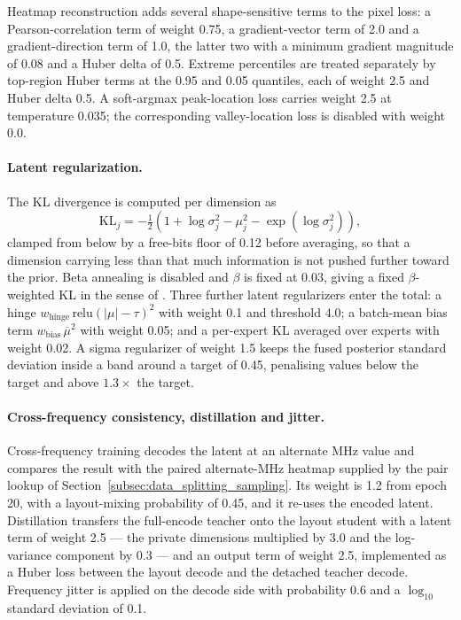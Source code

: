 Heatmap reconstruction adds several shape-sensitive terms to the pixel loss: a Pearson-correlation
term of weight 0.75, a gradient-vector term of 2.0 and a gradient-direction term of 1.0, the latter
two with a minimum gradient magnitude of 0.08 and a Huber delta of 0.5. Extreme percentiles are
treated separately by top-region Huber terms at the 0.95 and 0.05 quantiles, each of weight 2.5 and
Huber delta 0.5. A soft-argmax peak-location loss carries weight 2.5 at temperature 0.035; the
corresponding valley-location loss is disabled with weight 0.0.

\paragraph{Latent regularization.} The KL divergence is computed per dimension as
\begin{equation}
\mathrm{KL}_j = -\tfrac{1}{2}\left(1 + \log \sigma_j^2 - \mu_j^2 - \exp(\log \sigma_j^2)\right),
\label{eq:kl}
\end{equation}
clamped from below by a free-bits floor of 0.12 before averaging, so that a dimension carrying less
than that much information is not pushed further toward the prior. Beta annealing is disabled and
$\beta$ is fixed at 0.03, giving a fixed $\beta$-weighted KL in the sense of \cite{higgins2017beta}.
Three further latent regularizers enter the total: a hinge
$w_{\mathrm{hinge}} \, \mathrm{relu}(|\mu| - \tau)^2$ with weight 0.1 and threshold 4.0; a batch-mean
bias term $w_{\mathrm{bias}} \, \overline{\mu}^2$ with weight 0.05; and a per-expert KL averaged over
experts with weight 0.02. A sigma regularizer of weight 1.5 keeps the fused posterior standard
deviation inside a band around a target of 0.45, penalising values below the target and above
$1.3 \times$ the target.

\paragraph{Cross-frequency consistency, distillation and jitter.} Cross-frequency training decodes
the latent at an alternate MHz value and compares the result with the paired alternate-MHz heatmap
supplied by the pair lookup of Section~\ref{subsec:data_splitting_sampling}. Its weight is 1.2 from
epoch 20, with a layout-mixing probability of 0.45, and it re-uses the encoded latent. Distillation
transfers the full-encode teacher onto the layout student with a latent term of weight 2.5 --- the
private dimensions multiplied by 3.0 and the log-variance component by 0.3 --- and an output term of
weight 2.5, implemented as a Huber loss between the layout decode and the detached teacher decode.
Frequency jitter is applied on the decode side with probability 0.6 and a $\log_{10}$ standard
deviation of 0.1.

